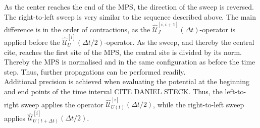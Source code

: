 As the center reaches the end of the MPS, the direction of the sweep is reversed. The right-to-left sweep is very similar to the sequence described above. The main difference is in the order of contractions, as the $\hat{\mathcal{U}}_{J}^{[i,i+1]} (\Delta t)$-operator is applied before the $\hat{\mathcal{U}}_{U}^{[i]} (\Delta t /2)$-operator. As the sweep, and thereby the central cite, reaches the first site of the MPS, the central site is divided by its norm. Thereby the MPS is normalised and in the same configuration as before the time step. Thus, further propagations can be performed readily.\\ 
Additional precision is achieved when evaluating the potential at the beginning and end points of the time interval CITE DANIEL STECK. Thus, the left-to-right sweep applies the operator $\hat{\mathcal{U}}_{U(t)}^{[i]} (\Delta t /2)$, while the right-to-left sweep applies $\hat{\mathcal{U}}_{U(t + \Delta t)}^{[i]} (\Delta t /2)$.\\

